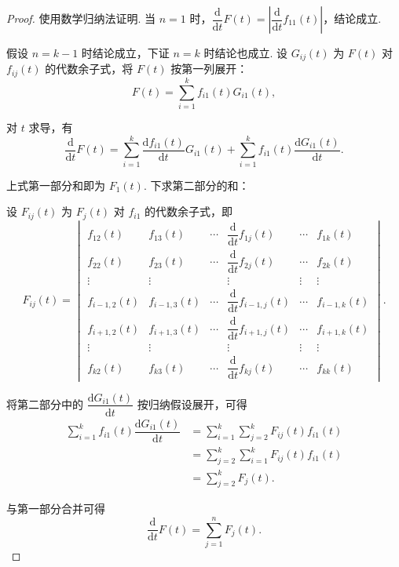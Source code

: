 \begin{proof}
    使用数学归纳法证明. 当 $n=1$ 时，$\dfrac{\mathrm{d}}{\mathrm{d}t}F(t) = \left\lvert \dfrac{\mathrm{d}}{\mathrm{d}t}f_{11}(t) \right\rvert$，结论成立.

    假设 $n=k-1$ 时结论成立，下证 $n=k$ 时结论也成立. 设 $G_{ij}(t)$ 为 $F(t)$ 对 $f_{ij}(t)$ 的代数余子式，将 $F(t)$ 按第一列展开：
    \[
        F(t) = \sum_{i=1}^k f_{i1}(t) G_{i1}(t),
    \]

    对 $t$ 求导，有
    \[
        \dfrac{\mathrm{d}}{\mathrm{d}t}F(t) = \sum_{i=1}^k \dfrac{\mathrm{d}f_{i1}(t)}{\mathrm{d}t} G_{i1}(t) + \sum_{i=1}^k f_{i1}(t) \dfrac{\mathrm{d}G_{i1}(t)}{\mathrm{d}t}.
    \]

    上式第一部分和即为 $F_1(t)$. 下求第二部分的和：

    设 $F_{ij}(t)$ 为 $F_j(t)$ 对 $f_{i1}$ 的代数余子式，即
    \[
        F_{ij}(t) = \begin{vmatrix}
            f_{12}(t) & f_{13}(t) & \cdots & \dfrac{\mathrm{d}}{\mathrm{d}t}f_{1j}(t) & \cdots & f_{1k}(t) \\[2ex]
            f_{22}(t) & f_{23}(t) & \cdots & \dfrac{\mathrm{d}}{\mathrm{d}t}f_{2j}(t) & \cdots & f_{2k}(t) \\[2ex]
            \vdots    & \vdots    &        & \vdots                                   & \vdots & \vdots    \\[2ex]
            f_{i-1,2}(t) & f_{i-1,3}(t) & \cdots & \dfrac{\mathrm{d}}{\mathrm{d}t}f_{i-1,j}(t) & \cdots & f_{i-1,k}(t) \\[2ex]
            f_{i+1,2}(t) & f_{i+1,3}(t) & \cdots & \dfrac{\mathrm{d}}{\mathrm{d}t}f_{i+1,j}(t) & \cdots & f_{i+1,k}(t) \\[2ex]
            \vdots    & \vdots    &        & \vdots                                   & \vdots & \vdots    \\[2ex]
            f_{k2}(t) & f_{k3}(t) & \cdots & \dfrac{\mathrm{d}}{\mathrm{d}t}f_{kj}(t) & \cdots & f_{kk}(t)
        \end{vmatrix}.
    \]

    将第二部分中的 $\dfrac{\mathrm{d}G_{i1}(t)}{\mathrm{d}t}$ 按归纳假设展开，可得
    \begin{align*}
        \sum_{i=1}^k f_{i1}(t) \dfrac{\mathrm{d}G_{i1}(t)}{\mathrm{d}t}
        &= \sum_{i=1}^k \sum_{j=2}^k F_{ij}(t) f_{i1}(t) \\
        &= \sum_{j=2}^k \sum_{i=1}^k F_{ij}(t) f_{i1}(t) \\
        &= \sum_{j=2}^k F_j(t).
    \end{align*}

    与第一部分合并可得
    \[
        \dfrac{\mathrm{d}}{\mathrm{d}t}F(t)=\sum\limits_{j=1}^nF_j(t).
    \]
\end{proof}


